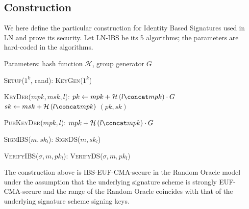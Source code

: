   \subsection{Construction}
    We here define the particular construction for Identity Based Signatures
    used in LN and prove its security. Let \textsc{LN-IBS} be its 5 algorithms;
    the parameters are hard-coded in the algorithms.

    Parameters: hash function $\mathcal{H}$, group generator $G$
    \begin{algorithmic}[0]
      \State \textsc{Setup}($1^k$, rand):
      \Indent
        \State \Return \textsc{KeyGen}($1^k$)
      \EndIndent
    \end{algorithmic}

    \begin{algorithmic}[0]
      \State \textsc{KeyDer}($mpk, msk, l$):
      \Indent
        \State $pk \gets mpk + \mathcal{H}\left(l \concat mpk\right) \cdot G$
        \State $sk \gets msk + \mathcal{H}\left(l \concat mpk\right)$
        \State \Return $(pk, sk)$
      \EndIndent
    \end{algorithmic}

    \begin{algorithmic}[0]
      \State \textsc{PubKeyDer}($mpk, l$):
      \Indent
        \State \Return $mpk + \mathcal{H}\left(l \concat mpk\right) \cdot G$
      \EndIndent
    \end{algorithmic}

    \begin{algorithmic}[0]
      \State \textsc{SignIBS}($m, sk_l$):
      \Indent
        \State \Return \textsc{SignDS}($m, sk_l$)
      \EndIndent
    \end{algorithmic}

    \begin{algorithmic}[0]
      \State \textsc{VerifyIBS}($\sigma, m, pk_l$):
      \Indent
        \State \Return \textsc{VerifyDS}($\sigma, m, pk_l$)
      \EndIndent
    \end{algorithmic}

    \begin{lemma}
      \label{lemma:ibs}
      The construction above is \textsf{IBS-EUF-CMA}-secure in the Random Oracle
      model under the assumption that the underlying signature scheme is
      strongly \textsf{EUF-CMA}-secure and the range of the Random Oracle
      coincides with that of the underlying signature scheme signing keys.
    \end{lemma}

